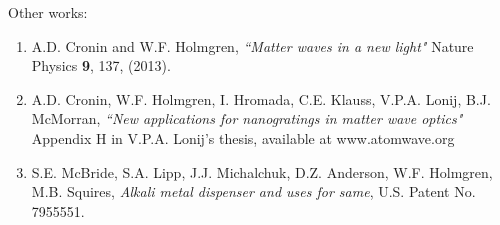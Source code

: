 \noindent Other works:

\begin{enumerate}

\item A.D. Cronin and W.F. Holmgren, \emph{``Matter waves in a new light"} Nature Physics {\bf{9}}, 137, (2013). 

\item A.D. Cronin, W.F. Holmgren, I. Hromada, C.E. Klauss, V.P.A. Lonij, B.J. McMorran, \emph{``New applications for nanogratings in matter wave optics"} Appendix H in V.P.A. Lonij's thesis, available at www.atomwave.org

\item S.E. McBride, S.A. Lipp, J.J. Michalchuk, D.Z. Anderson, W.F. Holmgren, M.B. Squires, \emph{Alkali metal dispenser and uses for same}, U.S. Patent No. 7955551.

\end{enumerate}



